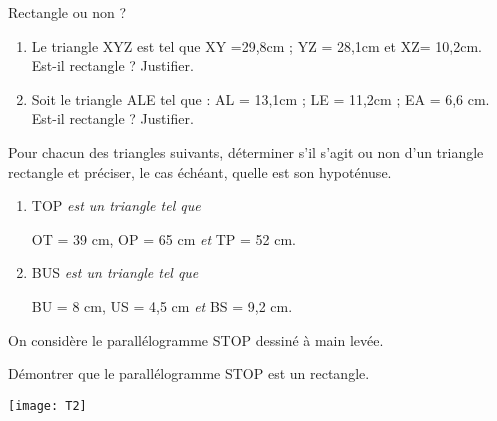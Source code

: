 \begin{exercice}
Rectangle ou non ?
\begin{enumerate}
\item Le triangle XYZ est tel que  XY =29,8cm ; YZ = 28,1cm et  XZ= 10,2cm.\\
Est-il rectangle ? Justifier.
\item Soit le triangle ALE tel que :	AL = 13,1cm ; LE = 11,2cm ; EA = 6,6 cm.\\
Est-il rectangle ? Justifier.
\end{enumerate}
\end{exercice}

\begin{exercice}
Pour chacun des triangles suivants, déterminer s'il s'agit ou non d'un triangle rectangle et préciser, le cas échéant, quelle est son hypoténuse.

\begin{enumerate}
\item TOP \emph{est un triangle tel que}

OT = 39 cm, OP = 65 cm \emph{et} TP = 52 cm.

\vspace{0.25cm}
\item BUS \emph{est un triangle tel que}

BU = 8 cm, US = 4,5 cm \emph{et} BS = 9,2 cm.
\end{enumerate}
\end{exercice}

\begin{exercice}
On considère le  parallélogramme STOP dessiné à main levée.\\
\begin{minipage}{0.6\linewidth}


Démontrer que le parallélogramme STOP est un rectangle.

\end{minipage}
\hfill
\begin{minipage}{0.3\linewidth}
\begin{center}
\texttt{[image: T2]}
\end{center}
\end{minipage}
\end{exercice}

